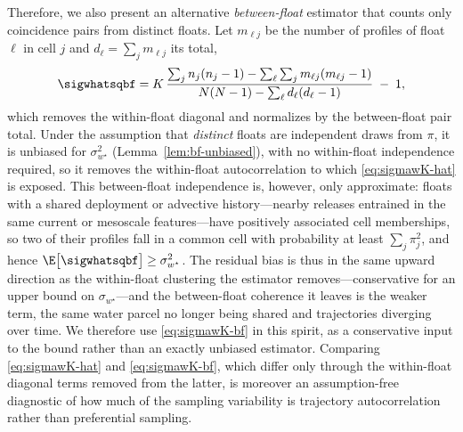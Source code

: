 Therefore, we also present an alternative \emph{between-float} estimator that counts only coincidence pairs from distinct floats.
Let $m_{\ell j}$ be the number of profiles of float $\ell$ in cell $j$ and $d_\ell=\sum_j m_{\ell j}$ its total, \begin{equation} \sigwhatsqbf = K\,\frac{\sum_j n_j(n_j-1)-\sum_\ell\sum_j m_{\ell j}(m_{\ell j}-1)} {N(N-1)-\sum_\ell d_\ell(d_\ell-1)}\;-\;1 , \label{eq:sigmawK-bf} \end{equation} which removes the within-float diagonal and normalizes by the between-float pair total.
Under the assumption that \emph{distinct} floats are independent draws from $\pi$, it is unbiased for $\sigma_{w^{\star}}^2$ (Lemma~\ref{lem:bf-unbiased}), with no within-float independence required, so it removes the within-float autocorrelation to which \eqref{eq:sigmawK-hat} is exposed.
This between-float independence is, however, only approximate: floats with a shared deployment or advective history---nearby releases entrained in the same current or mesoscale features---have positively associated cell memberships, so two of their profiles fall in a common cell with probability at least $\sum_j\pi_j^2$, and hence $\E\big[\sigwhatsqbf\big]\ge\sigma_{w^{\star}}^2$. The residual bias is thus in the same upward direction as the within-float clustering the estimator removes---conservative for an upper bound on $\sigma_{w^{\star}}$---and the between-float coherence it leaves is the weaker term, the same water parcel no longer being shared and trajectories diverging over time. We therefore use \eqref{eq:sigmawK-bf} in this spirit, as a conservative input to the bound rather than an exactly unbiased estimator.
Comparing \eqref{eq:sigmawK-hat} and \eqref{eq:sigmawK-bf}, which differ only through the within-float diagonal terms removed from the latter, is moreover an assumption-free diagnostic of how much of the sampling variability is trajectory autocorrelation rather than preferential sampling.

